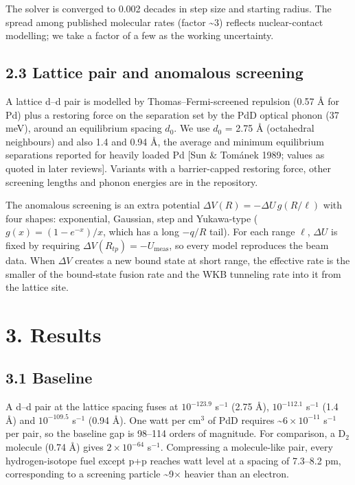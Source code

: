 \documentclass[
]{article}
\begin{document}
The solver is converged to 0.002 decades in step size and starting
radius. The spread among published molecular rates (factor
\textasciitilde3) reflects nuclear-contact modelling; we take a factor
of a few as the working uncertainty.

\hypertarget{lattice-pair-and-anomalous-screening}{%
\subsection{2.3 Lattice pair and anomalous
screening}\label{lattice-pair-and-anomalous-screening}}

A lattice d--d pair is modelled by Thomas--Fermi-screened repulsion
(0.57 Å for Pd) plus a restoring force on the separation set by the PdD
optical phonon (37 meV), around an equilibrium spacing \(d_0\). We use
\(d_0\) = 2.75 Å (octahedral neighbours) and also 1.4 and 0.94 Å, the
average and minimum equilibrium separations reported for heavily loaded
Pd {[}Sun \& Tománek 1989; values as quoted in later reviews{]}.
Variants with a barrier-capped restoring force, other screening lengths
and phonon energies are in the repository.

The anomalous screening is an extra potential
\(\Delta V(R) = -\Delta U\,g(R/\ell)\) with four shapes: exponential,
Gaussian, step and Yukawa-type (\(g(x) = (1-e^{-x})/x\), which has a
long \(-q/R\) tail). For each range \(\ell\), \(\Delta U\) is fixed by
requiring \(\Delta V(R_{tp}) = -U_{\mathrm{meas}}\), so every model
reproduces the beam data. When \(\Delta V\) creates a new bound state at
short range, the effective rate is the smaller of the bound-state fusion
rate and the WKB tunneling rate into it from the lattice site.

\hypertarget{results}{%
\section{3. Results}\label{results}}

\hypertarget{baseline}{%
\subsection{3.1 Baseline}\label{baseline}}

A d--d pair at the lattice spacing fuses at \(10^{-123.9}\) s\(^{-1}\)
(2.75 Å), \(10^{-112.1}\) s\(^{-1}\) (1.4 Å) and \(10^{-109.5}\)
s\(^{-1}\) (0.94 Å). One watt per cm\(^3\) of PdD requires
\textasciitilde{}\(6\times10^{-11}\) s\(^{-1}\) per pair, so the
baseline gap is 98--114 orders of magnitude. For comparison, a D\(_2\)
molecule (0.74 Å) gives \(2\times10^{-64}\) s\(^{-1}\). Compressing a
molecule-like pair, every hydrogen-isotope fuel except p+p reaches watt
level at a spacing of 7.3--8.2 pm, corresponding to a screening particle
\textasciitilde9× heavier than an electron.
\end{document}

